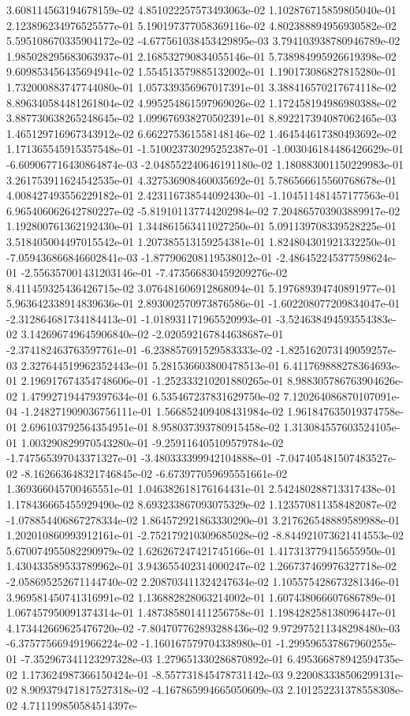 3.608114563194678159e-02	4.851022257573493063e-02	1.102876715859805040e-01	2.123896234976525577e-01	5.190197377058369116e-02	4.802388894956930582e-02	5.595108670335904172e-02	-4.677561038453429895e-03	3.794103938780946789e-02	1.985028295683063937e-01	2.168532790834055146e-01	5.738984995926619398e-02	9.609853456435694941e-02	1.554513579885132002e-01	1.190173086827815280e-01	1.732000883747744080e-01	1.057339356967017391e-01	3.388416570217674118e-02	8.896340584481261804e-02	4.995254861597969026e-02	1.172458194986980388e-02	3.887730638265248645e-02	1.099676938270502391e-01	8.892217394087062465e-03	1.465129716967343912e-02	6.662275361558148146e-02	1.464544617380493692e-02	1.171365545915357548e-01	-1.510023730295252387e-01	-1.003046184486426629e-01	-6.609067716430864874e-03	-2.048552240646191180e-02	1.180883001150229983e-01	3.261753911624542535e-01	4.327536908460035692e-01	5.786566615560768678e-01	4.008427493556229182e-01	2.423116738544092430e-01	-1.104511481457177563e-01	6.965406062642780227e-02	-5.819101137744202984e-02	7.204865703903889917e-02	1.192800761362192430e-01	1.344861563411027250e-01	5.091139708339528225e-01	3.518405004497015542e-01	1.207385513159254381e-01	1.824804301921332250e-01	-7.059436866846602841e-03	-1.877906208119538012e-01	-2.486452245377598624e-01	-2.556357001431203146e-01	-7.473566830459209276e-02	8.411459325436426715e-02	3.076481606912868094e-01	5.197689394740891977e-01	5.963642338914839636e-01	2.893002570973876586e-01	-1.602208077209834047e-01	-2.312864681734184413e-01	-1.018931171965520993e-01	-3.524638494593554383e-02	3.142696749645906840e-02	-2.020592167844638687e-01	-2.374182463763597761e-01	-6.238857691529583333e-02	-1.825162073149059257e-03	2.327644519962352443e-01	5.281536603800478513e-01	6.411769888278364693e-01	2.196917674354748606e-01	-1.252333210201880265e-01	8.988305786763904626e-02	1.479927194479397634e-01	6.535467237831629750e-02	7.120264086870107091e-04	-1.248271909036756111e-01	1.566852409408431984e-02	1.961847635019374758e-01	2.696103792564354951e-01	8.958037393780915458e-02	1.313084557603524105e-01	1.003290829970543280e-01	-9.259116405109579784e-02	-1.747565397043371327e-01	-3.480333399942104888e-01	-7.047405481507483527e-02	-8.162663648321746845e-02	-6.673977059695551661e-02	1.369366045700465551e-01	1.046382618176164431e-01	2.542480288713317438e-01	1.178436665455929490e-02	8.693233867093075329e-02	1.123570811358482087e-02	-1.078854406867278334e-02	1.864572921863330290e-01	3.217626548889589988e-01	1.202010860993912161e-01	-2.752179210309685028e-02	-8.844921073621414553e-02	5.670074955082290979e-02	1.626267247421745166e-01	1.417313779415655950e-01	1.430433589533789962e-01	3.943655402314000247e-02	1.266737469976327718e-02	-2.058695252671144740e-02	2.208703411324247634e-02	1.105575428673281346e-01	3.969581450741316991e-02	1.136882828063214002e-01	1.607438066607686789e-01	1.067457950091374314e-01	1.487385801411256758e-01	1.198428258138096447e-01	4.173442669625476720e-02	-7.804707762893288436e-02	9.972975211348298480e-03	-6.375775669491966224e-02	-1.160167579704338980e-01	-1.299596537867960255e-01	-7.352967341123297328e-03	1.279651330286870892e-01	6.495366878942594735e-02	1.173624987366150424e-01	-8.557731845478731142e-03	9.220083338506299131e-02	8.909379471817527318e-02	-4.167865994665050609e-03	2.101252231378558308e-02	4.711199850584514397e-